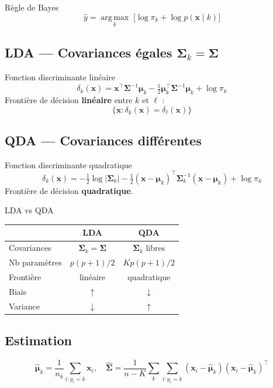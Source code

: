 \documentclass[10pt,a4paper,twocolumn]{article}
\newcommand{\argmax}{\operatorname*{arg\,max}}
\newcommand{\T}{^{\!\top}}   %
\begin{document}
\begin{formulebox}{Règle de Bayes}
\[
\hat{y} = \argmax_k \;\bigl[\log\pi_k + \log p(\mathbf{x}\mid k)\bigr]
\]
\end{formulebox}

\subsection{LDA — Covariances égales $\bm{\Sigma}_k = \bm{\Sigma}$}
\begin{formulebox}{Fonction discriminante linéaire}
\[
\delta_k(\mathbf{x}) = \mathbf{x}\T\bm{\Sigma}^{-1}\bm{\mu}_k - \tfrac{1}{2}\bm{\mu}_k\T\bm{\Sigma}^{-1}\bm{\mu}_k + \log\pi_k
\]
Frontière de décision \textbf{linéaire} entre $k$ et $\ell$ :
\[
\{\mathbf{x}: \delta_k(\mathbf{x}) = \delta_\ell(\mathbf{x})\}
\]
\end{formulebox}

\subsection{QDA — Covariances différentes}
\begin{formulebox}{Fonction discriminante quadratique}
\[
\delta_k(\mathbf{x}) = -\tfrac{1}{2}\log|\bm{\Sigma}_k| -\tfrac{1}{2}(\mathbf{x}-\bm{\mu}_k)\T\bm{\Sigma}_k^{-1}(\mathbf{x}-\bm{\mu}_k) + \log\pi_k
\]
Frontière de décision \textbf{quadratique}.
\end{formulebox}

\begin{defbox}{LDA vs QDA}
\begin{tabular}{@{}lcc@{}}
\toprule
 & LDA & QDA \\
\midrule
Covariances & $\bm{\Sigma}_k = \bm{\Sigma}$ & $\bm{\Sigma}_k$ libres \\
Nb paramètres & $p(p+1)/2$ & $Kp(p+1)/2$ \\
Frontière & linéaire & quadratique \\
Biais & $\uparrow$ & $\downarrow$ \\
Variance & $\downarrow$ & $\uparrow$ \\
\bottomrule
\end{tabular}
\end{defbox}

\subsection{Estimation}
\[
\hat{\bm{\mu}}_k = \frac{1}{n_k}\sum_{i: y_i=k}\mathbf{x}_i, \quad
\hat{\bm{\Sigma}} = \frac{1}{n-K}\sum_{k}\sum_{i:y_i=k}(\mathbf{x}_i-\hat{\bm{\mu}}_k)(\mathbf{x}_i-\hat{\bm{\mu}}_k)\T
\]
\end{document}
